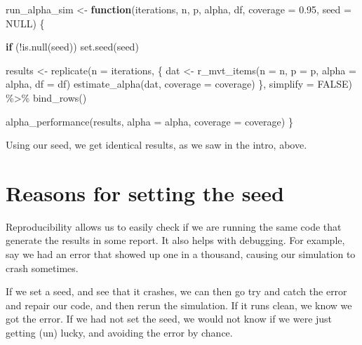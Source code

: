 \documentclass[
]{book}
\newenvironment{Shaded}{\begin{snugshade}}{\end{snugshade}}
\newcommand{\AttributeTok}[1]{\textcolor[rgb]{0.77,0.63,0.00}{#1}}
\newcommand{\ConstantTok}[1]{\textcolor[rgb]{0.00,0.00,0.00}{#1}}
\newcommand{\ControlFlowTok}[1]{\textcolor[rgb]{0.13,0.29,0.53}{\textbf{#1}}}
\newcommand{\FloatTok}[1]{\textcolor[rgb]{0.00,0.00,0.81}{#1}}
\newcommand{\FunctionTok}[1]{\textcolor[rgb]{0.00,0.00,0.00}{#1}}
\newcommand{\NormalTok}[1]{#1}
\newcommand{\OtherTok}[1]{\textcolor[rgb]{0.56,0.35,0.01}{#1}}
\newcommand{\SpecialCharTok}[1]{\textcolor[rgb]{0.00,0.00,0.00}{#1}}
\begin{document}
\begin{Shaded}
\begin{Highlighting}[]
\NormalTok{run\_alpha\_sim }\OtherTok{\textless{}{-}} \ControlFlowTok{function}\NormalTok{(iterations, n, p, alpha, df, }\AttributeTok{coverage =} \FloatTok{0.95}\NormalTok{, }\AttributeTok{seed =} \ConstantTok{NULL}\NormalTok{) \{}
  
  \ControlFlowTok{if}\NormalTok{ (}\SpecialCharTok{!}\FunctionTok{is.null}\NormalTok{(seed)) }\FunctionTok{set.seed}\NormalTok{(seed)}

\NormalTok{  results }\OtherTok{\textless{}{-}} 
    \FunctionTok{replicate}\NormalTok{(}\AttributeTok{n =}\NormalTok{ iterations, \{}
\NormalTok{      dat }\OtherTok{\textless{}{-}} \FunctionTok{r\_mvt\_items}\NormalTok{(}\AttributeTok{n =}\NormalTok{ n, }\AttributeTok{p =}\NormalTok{ p, }\AttributeTok{alpha =}\NormalTok{ alpha, }\AttributeTok{df =}\NormalTok{ df)}
      \FunctionTok{estimate\_alpha}\NormalTok{(dat, }\AttributeTok{coverage =}\NormalTok{ coverage)}
\NormalTok{    \}, }\AttributeTok{simplify =} \ConstantTok{FALSE}\NormalTok{) }\SpecialCharTok{\%\textgreater{}\%}
    \FunctionTok{bind\_rows}\NormalTok{()}
  
  \FunctionTok{alpha\_performance}\NormalTok{(results, }\AttributeTok{alpha =}\NormalTok{ alpha, }\AttributeTok{coverage =}\NormalTok{ coverage)}
\NormalTok{\}}
\end{Highlighting}
\end{Shaded}

Using our seed, we get identical results, as we saw in the intro, above.

\hypertarget{reasons-for-setting-the-seed}{%
\section{Reasons for setting the seed}\label{reasons-for-setting-the-seed}}

Reproducibility allows us to easily check if we are running the same code that generate the results in some report.
It also helps with debugging.
For example, say we had an error that showed up one in a thousand, causing our simulation to crash sometimes.

If we set a seed, and see that it crashes, we can then go try and catch the error and repair our code, and then rerun the simulation.
If it runs clean, we know we got the error.
If we had not set the seed, we would not know if we were just getting (un) lucky, and avoiding the error by chance.
\end{document}
